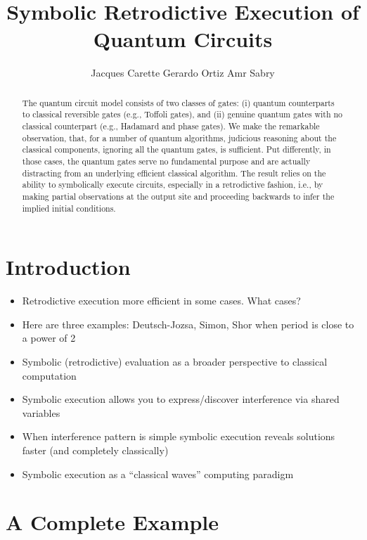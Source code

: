 \documentclass{article}
\title{Symbolic Retrodictive Execution of Quantum Circuits}
\author{Jacques Carette \qquad Gerardo Ortiz \qquad Amr Sabry}
\begin{document}
\maketitle

\begin{abstract}
The quantum circuit model consists of two classes of gates: (i) quantum counterparts to classical reversible gates (e.g., Toffoli gates), and (ii) genuine quantum gates with no classical counterpart (e.g., Hadamard and phase gates). We make the remarkable observation, that, for a number of quantum algorithms, judicious reasoning about the classical components, ignoring all the quantum gates, is sufficient. Put differently, in those cases, the quantum gates serve no fundamental purpose and are actually distracting from an underlying efficient classical algorithm. The result relies on the ability to symbolically execute circuits, especially in a retrodictive fashion, i.e., by making partial observations at the output site and proceeding backwards to infer the implied initial conditions.
\end{abstract}

\section{Introduction}

\begin{itemize}
\item Retrodictive execution more efficient in some cases. What cases?
\item Here are three examples: Deutsch-Jozsa, Simon, Shor when period is close to a power of 2
\item Symbolic (retrodictive) evaluation as a broader perspective to classical computation
\item Symbolic execution allows you to express/discover interference via shared variables
\item When interference pattern is simple symbolic execution reveals solutions faster (and completely classically) 
\item Symbolic execution as a “classical waves” computing paradigm
\end{itemize}

\section{A Complete Example}
\end{document}
